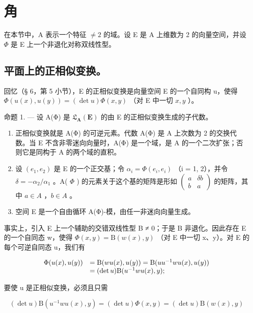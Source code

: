 \section{角}

在本节中，A 表示一个特征 \(\neq 2\) 的域。设 E 是 A 上维数为 2 的向量空间，并设 \(\Phi\) 是 E 上一个非退化对称双线性型。

\subsection{平面上的正相似变换。}

回忆（§ 6，第 5 小节），E 的正相似变换是向量空间 E 的一个自同构 u，使得 \(\Phi(u(x), u(y)) = (\det u)\Phi(x, y)\) （对 E 中一切 \(x, y\) ）。

命题 1. --- 设 A(Φ) 是 \(\mathfrak{L}_{\mathbf{A}}(\mathbf{E})\) 的由 E 的正相似变换生成的子代数。

\begin{enumerate}
\def\labelenumi{\alph{enumi})}
\item
  正相似变换就是 A(Φ) 的可逆元素。代数 A(Φ) 是 A 上次数为 2 的交换代数。当 E 不含非零迷向向量时，A(Φ) 是一个域，是 A 的一个二次扩张；否则它是同构于 A 的两个域的直积。
\item
  设 \((e_{1}, e_{2})\) 是 E 的一个正交基；令 \(\alpha_{i} = \Phi(e_{i}, e_{i})\) （i = 1, 2），并令 \(\delta = -\alpha_{2}/\alpha_{1}\) 。A( \(\Phi\) ) 的元素关于这个基的矩阵是形如 \(\begin{pmatrix} a & \delta b \\ b & a \end{pmatrix}\) 的矩阵，其中 \(a \in A\) ，\(b \in A\) 。
\item
  空间 E 是一个自由循环 A(Φ)-模，由任一非迷向向量生成。
\end{enumerate}

事实上，引入 E 上一个辅助的交错双线性型 B ≠ 0；于是 B 非退化。因此存在 E 的一个自同态 w，使得 \(\Phi(x, y) = \mathrm{B}(w(x), y)\) （对 E 中一切 x、y）。对 E 的每个可逆自同态 u，我们有

\[
\begin{array}{r l} \Phi (u (x), u (y)) & = \mathrm{B} (w u (x), u (y)) = \mathrm{B} (u u ^ {- 1} w u (x), u (y)) \\ & = (\det u) \mathrm{B} (u ^ {- 1} w u (x), y); \end{array}
\]

要使 u 是正相似变换，必须且只需

\[
(\det u) \mathrm{B} (u ^ {- 1} w u (x), y) = (\det u) \Phi (x, y) = (\det u) \mathrm{B} (w (x), y)
\]

